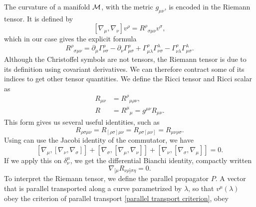 The curvature of a manifold $\mathcal{M}$, with the metric $g_{\mu \nu}$, is encoded in the Riemann tensor.
It is defined by
%
\begin{equation}
    \label{Riemann tensor}
    [\nabla_\mu, \nabla_\nu] v^\rho = R^{\rho}{}_{\sigma \mu \nu} v^\sigma,
\end{equation}
%
which in our case gives the explicit formula
%
\begin{equation}
    \label{riemann tensor in terms of christoffel symbols}
    R^\rho{}_{\sigma \mu \nu} 
    = \partial_{\mu} \Gamma^{\rho}_{\nu \sigma}
    - \partial_{\nu} \Gamma^{\rho}_{\mu \sigma}
    + \Gamma^{\rho}_{\mu \lambda} \Gamma^{\lambda}_{\nu \sigma}  
    - \Gamma^{\rho}_{\nu \lambda} \Gamma^{\lambda}_{\mu \sigma}.
\end{equation}
%
Although the Christoffel symbols are not tensors, the Riemann tensor is due to its definition using covariant derivatives.
We can therefore contract some of its indices to get other tensor quantities.
We  define the Ricci tensor and Ricci scalar as
%
\begin{align}
    \label{Ricci tensor}
    R_{\mu \nu} &= R^{\rho}{}_{\mu \rho \nu}, \\
    \label{Ricci scalar}
    R &= R^{\mu}{}_{\mu} = g^{\mu \nu} R_{\mu \nu}.
\end{align}
%
This form gives us several useful identities, such as
%
\begin{equation}
    R_{\rho \sigma \mu \nu} 
    = 
    R_{[\rho \sigma] \mu \nu}
    =
    R_{\rho \sigma [\mu \nu]}
    =
    R_{\mu \nu \rho \sigma }.
\end{equation}
%
Using can use the Jacobi identity of the commutator, we have
%
\begin{equation}
    \label{Jacobi identity differential geometry}
    [\nabla_\mu, [\nabla_\nu, \nabla_\sigma]]
    + [\nabla_\sigma, [\nabla_\mu, \nabla_\nu]]
    + [\nabla_\nu, [\nabla_\sigma, \nabla_\mu]] = 0.
\end{equation}
%
If we apply this on $\delta^{\mu}_{\nu}$, we get the differential Bianchi identity, compactly written
%
\begin{equation}
    \label{Binachi identiy}
    \nabla_{[\mu}R_{\nu \rho]\sigma \eta} = 0.
\end{equation}
%
To interpret the Riemann tensor, we define the parallel propagator $P$.
A vector that is parallel transported along a curve parametrized by $\lambda$, so that $v^\mu(\lambda)$ obey the criterion of parallel transport \autoref{parallel transport criterion}, obey
